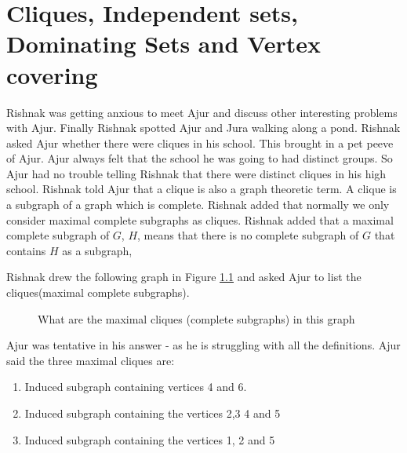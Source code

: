 \chapter{Cliques, Independent sets, Dominating Sets  and Vertex covering }
Rishnak was getting anxious to meet Ajur and discuss other interesting problems with Ajur. Finally Rishnak spotted Ajur and Jura walking along a pond. Rishnak asked Ajur whether there were cliques in his school. This brought in a pet peeve of Ajur. Ajur always felt that the school he was going to had distinct groups. So Ajur had no trouble telling Rishnak that there were distinct cliques in his high school. Rishnak told Ajur that a clique is also a graph theoretic term. A clique is a subgraph of a graph which is complete. Rishnak added that normally we only consider maximal complete subgraphs as cliques. Rishnak added that a maximal complete subgraph of $G$, $H$, means that there is no complete subgraph of $G$ that contains $H$ as a subgraph,

Rishnak drew the following graph in Figure \ref{13g1} and asked Ajur to list the cliques(maximal complete subgraphs).
\begin{figure}
\begin{center}
\caption{ What are the maximal cliques (complete subgraphs) in this graph}\label{13g1}
\end{center}
\end{figure}

Ajur was tentative in his answer - as he is struggling with all the definitions. Ajur said the three maximal cliques are: 
\begin{enumerate}
    \item Induced subgraph containing vertices 4 and 6.
    \item Induced subgraph containing the vertices 2,3 4 and 5
    \item Induced subgraph containing the vertices 1, 2 and 5
\end{enumerate} 


